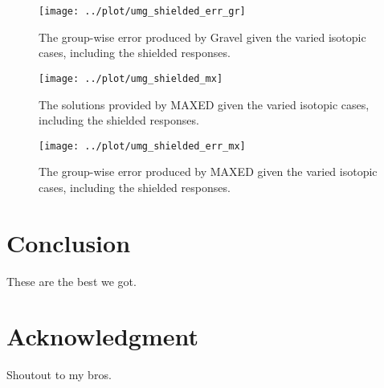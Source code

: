 \documentclass[journal]{IEEEtran}
\begin{document}
\begin{figure}[h!tb]
  \centering
  \texttt{[image: ../plot/umg\_shielded\_err\_gr]}
  \caption{The group-wise error produced by Gravel given the varied isotopic cases, including the shielded responses.}
  \label{fig:shielded_err_gr}
\end{figure}

\begin{figure}[h!tb]
  \centering
  \texttt{[image: ../plot/umg\_shielded\_mx]}
  \caption{The solutions provided by MAXED given the varied isotopic cases, including the shielded responses.}
  \label{fig:shielded_mx}
\end{figure}

\begin{figure}[h!tb]
  \centering
  \texttt{[image: ../plot/umg\_shielded\_err\_mx]}
  \caption{The group-wise error produced by MAXED given the varied isotopic cases, including the shielded responses.}
  \label{fig:shielded_err_mx}
\end{figure}

\section{Conclusion}

These are the best we got.

 
\section*{Acknowledgment}

Shoutout to my bros.

\ifCLASSOPTIONcaptionsoff
  \newpage
\fi






%
%
\end{document}
